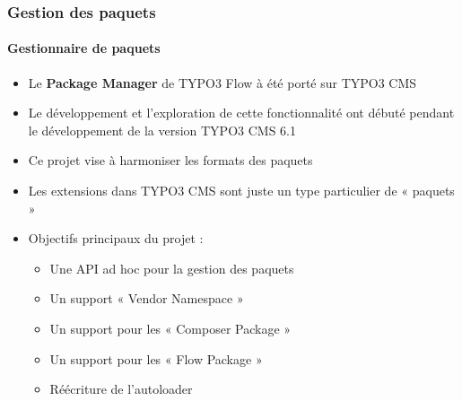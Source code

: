 \begin{frame}[fragile]
	\frametitle{Gestion des paquets}
	\framesubtitle{Gestionnaire de paquets}

	\begin{itemize}
		\item Le \textbf{Package Manager} de TYPO3 Flow à été porté sur TYPO3 CMS
		\item Le développement et l'exploration de cette fonctionnalité ont débuté pendant le développement de la version TYPO3 CMS 6.1
		\item Ce projet vise à harmoniser les formats des paquets
		\item Les extensions dans TYPO3 CMS sont juste un type particulier de \newline
				« paquets »
		\item Objectifs principaux du projet :

			\begin{itemize}
				\item Une API ad hoc pour la gestion des paquets
				\item Un support « Vendor Namespace »
				\item Un support pour les « Composer Package »
				\item Un support pour les « Flow Package »
				\item Réécriture de l'autoloader
			\end{itemize}

	\end{itemize}

\end{frame}


